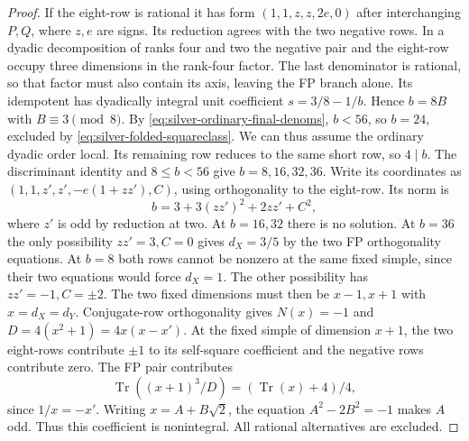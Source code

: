 \documentclass[11pt,reqno]{amsart}
\theoremstyle{remark}\newtheorem{remark}[theorem]{Remark}
\numberwithin{equation}{section}
\begin{document}
\begin{proof}
If the eight-row is rational it has form $(1,1,z,z,2e,0)$ after interchanging $P,Q$, where $z,e$ are signs. Its reduction agrees with the two negative rows. In a dyadic decomposition of ranks four and two the negative pair and the eight-row occupy three dimensions in the rank-four factor. The last denominator is rational, so that factor must also contain its axis, leaving the FP branch alone. Its idempotent has dyadically integral unit coefficient $s=3/8-1/b$. Hence $b=8B$ with $B\equiv3\pmod8$. By \eqref{eq:silver-ordinary-final-denoms}, $b<56$, so $b=24$, excluded by \eqref{eq:silver-folded-squareclass}. We can thus assume the ordinary dyadic order local. Its remaining row reduces to the same short row, so $4\mid b$. The discriminant identity and $8\le b<56$ give $b=8,16,32,36$. Write its coordinates as $(1,1,z',z',-e(1+zz'),C)$, using orthogonality to the eight-row. Its norm is
\[
 b=3+3(zz')^2+2zz'+C^2,
\]
where $z'$ is odd by reduction at two. At $b=16,32$ there is no solution. At $b=36$ the only possibility $zz'=3,C=0$ gives $d_X=3/5$ by the two FP orthogonality equations. At $b=8$ both rows cannot be nonzero at the same fixed simple, since their two equations would force $d_X=1$. The other possibility has $zz'=-1,C=\pm2$. The two fixed dimensions must then be $x-1,x+1$ with $x=d_X=d_Y$. Conjugate-row orthogonality gives $N(x)=-1$ and $D=4(x^2+1)=4x(x-x')$. At the fixed simple of dimension $x+1$, the two eight-rows contribute $\pm1$ to its self-square coefficient and the negative rows contribute zero. The FP pair contributes
\[
 \operatorname{Tr}((x+1)^3/D)=(\operatorname{Tr}(x)+4)/4,
\]
since $1/x=-x'$. Writing $x=A+B\sqrt2$, the equation $A^2-2B^2=-1$ makes $A$ odd. Thus this coefficient is nonintegral. All rational alternatives are excluded.
\end{proof}
\end{document}
